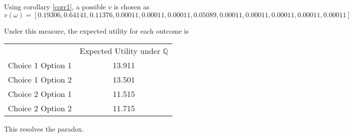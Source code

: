 \documentclass{article}
\begin{document}
Using corollary \ref{corr1}, a possible \(v\) is chosen as \[v(\omega)=[0.19306, 0.64141, 0.11376, 0.00011, 0.00011, 0.00011, 0.05089, 0.00011, 0.00011, 0.00011, 0.00011, 0.00011]\] 

Under this measure, the expected utility for each outcome is 

\begin{center} 
	\begin{tabular}{c c}
		& Expected Utility under \(\mathbb{Q}\) \\
		Choice 1 Option 1 & 13.911 \\
		Choice 1 Option 2 & 13.501 \\
		Choice 2 Option 1 & 11.515 \\
		Choice 2 Option 2 & 11.715 \\
	\end{tabular}
\end{center}

This resolves the paradox.  
	
\end{document}
